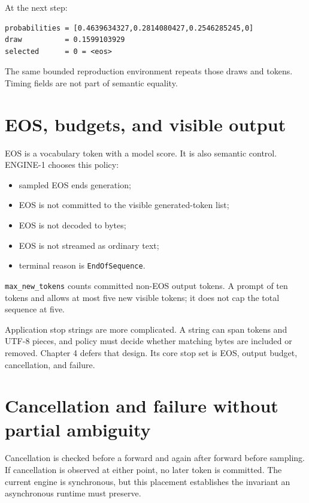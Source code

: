 At the next step:

\begin{verbatim}
probabilities = [0.4639634327,0.2814080427,0.2546285245,0]
draw          = 0.1599103929
selected      = 0 = <eos>
\end{verbatim}

The same bounded reproduction environment repeats those draws and
tokens. Timing fields are not part of semantic equality.

\section{EOS, budgets, and visible
output}\label{eos-budgets-and-visible-output}

EOS is a vocabulary token with a model score. It is also semantic
control. ENGINE-1 chooses this policy:

\begin{itemize}
\tightlist
\item
  sampled EOS ends generation;
\item
  EOS is not committed to the visible generated-token list;
\item
  EOS is not decoded to bytes;
\item
  EOS is not streamed as ordinary text;
\item
  terminal reason is \texttt{EndOfSequence}.
\end{itemize}

\texttt{max\_new\_tokens} counts committed non-EOS output tokens. A
prompt of ten tokens and \texttt{} allows
at most five new visible tokens; it does not cap the total sequence at
five.

Application stop strings are more complicated. A string can span tokens
and UTF-8 pieces, and policy must decide whether matching bytes are
included or removed. Chapter 4 defers that design. Its core stop set is
EOS, output budget, cancellation, and failure.

\section{Cancellation and failure without partial
ambiguity}\label{cancellation-and-failure-without-partial-ambiguity}

Cancellation is checked before a forward and again after forward before
sampling. If cancellation is observed at either point, no later token is
committed. The current engine is synchronous, but this placement
establishes the invariant an asynchronous runtime must preserve.


